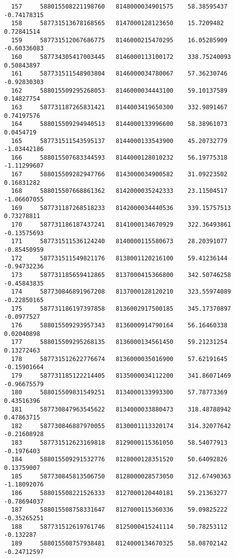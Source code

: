 \documentclass[a4paper,11pt]{article}
\begin{document}
\begin{verbatim}
  157     588015508221198760   8148000034901575    58.38595437    -0.74178315  
  158     587731513678168565   8147000128123650    15.7209482     0.72841514   
  159     587731512067686775   8146000215470295    16.05285909    -0.60336083  
  160     587734305417003445   8146000113100172    338.75240093   0.50843897   
  161     587731511548903804   8146000034780067    57.36230746    -0.92830303  
  162     588015509295268053   8146000034443100    59.10137589    0.14827754   
  163     587731187265831421   8144003419650300    332.9891467    0.74197576   
  164     588015509294940513   8144000133996600    58.38961073    0.0454719    
  165     587731511543595137   8144000133543900    45.20732779    -1.03442186  
  166     588015507683344593   8144000128010232    56.19775318    -1.11299607  
  167     588015509282947766   8143000034900582    31.09223502    0.16831282   
  168     588015507668861362   8142000035242333    23.11504517    -1.06607055  
  169     587731187268518233   8142000034440536    339.15757513   0.73278811   
  170     587731186187437241   8141000134670929    322.36493861   -0.13575693  
  171     587731511536124240   8140000115580673    28.20391077    -0.85450959  
  172     587731511549821176   8138001120216100    59.41236144    -0.94732236  
  173     587731185659412865   8137000415366800    342.50746258   -0.45843835  
  174     587730846891967208   8137000128120210    323.55974089   -0.22850165  
  175     587731186197397858   8136002917500185    345.17370897   -0.0977527   
  176     588015509293957343   8136000914790164    56.16460338    0.02040898   
  177     588015509295268135   8136000134561450    59.21231254    0.13272463   
  178     587731512622776674   8136000035016900    57.62191645    -0.15901664  
  179     587731185122214405   8135000034112200    341.86071469   -0.96675579  
  180     588015509831549251   8134000133993300    57.78773369    0.43516396   
  181     587730847963545622   8134000033880473    318.48788942   0.47863715   
  182     587730846887970055   8130001113320174    314.32077642   -0.21608928  
  183     587731512623169818   8129000115361050    58.54077913    -0.1976403   
  184     588015509291532776   8128000128351520    50.64092826    0.13759007   
  185     587730845813506750   8128000028573050    312.67490363   -1.18092076  
  186     588015508221526333   8127000120440181    59.21363277    -0.78694037  
  187     588015508758331647   8127000115360336    59.09825222    -0.35265251  
  188     587731512619761746   8125000415241114    50.78253112    -0.132287    
  189     588015508757938481   8124000134670325    58.08702142    -0.24712597  

\end{verbatim}
\end{document}
